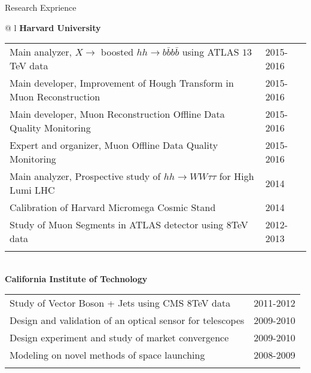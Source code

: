 \documentclass[letterpaper,11pt,oneside]{article}
\begin{document}
 \raggedright
 \Large{Research Exprience} \\
 \normalsize
\begin{flushleft}
\hspace{1cm}
 \begin{tabular}{@{} l}
    \textbf{Harvard University} \\ 
    \begin{tabular}{@{} l l }
 Main analyzer, $X \to$ boosted $ hh \to b\bar{b}b\bar{b}$ using ATLAS $13$TeV data & 2015-2016\\
 Main developer, Improvement of Hough Transform in Muon Reconstruction & 2015-2016\\
 Main developer, Muon Reconstruction Offline Data Quality Monitoring & 2015-2016\\
 Expert and organizer,  Muon Offline Data Quality Monitoring  & 2015-2016\\
 Main analyzer, Prospective study of $hh \to WW\tau\tau$ for High Lumi LHC & 2014\\
 Calibration of Harvard Micromega Cosmic Stand & 2014\\
 Study of Muon Segments in ATLAS detector using $8$TeV data & 2012-2013\\
    \hspace{0.8\linewidth} & \hspace{0.1\linewidth} \\
     \end{tabular}
     \\
     \textbf{California Institute of Technology} \\
     \begin{tabular}{@{} l l }
 Study of Vector Boson + Jets using CMS $8$TeV data&2011-2012\\
 Design and validation of an optical sensor for telescopes&2009-2010\\
 Design experiment and study of market convergence &2009-2010\\
 Modeling on novel methods of space launching&2008-2009\\
    \hspace{0.8\linewidth} & \hspace{0.1\linewidth} \\
      \end{tabular}
      \end{tabular}
\end{flushleft}
\newpage
\end{document}
